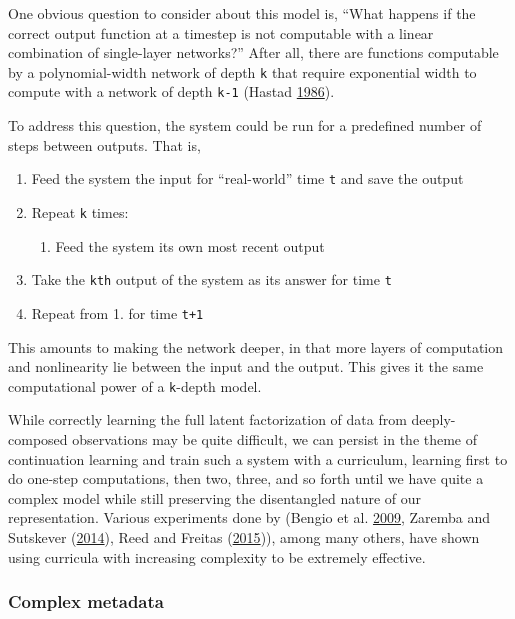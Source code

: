 \documentclass[12pt,twoside]{mitthesis}
\providecommand{\tightlist}{%
  \setlength{\itemsep}{0pt}\setlength{\parskip}{0pt}}
\begin{document}
One obvious question to consider about this model is, ``What happens if
the correct output function at a timestep is not computable with a
linear combination of single-layer networks?'' After all, there are
functions computable by a polynomial-width network of depth \texttt{k}
that require exponential width to compute with a network of depth
\texttt{k-1} (Hastad \protect\hyperlink{ref-hastad1986almost}{1986}).

To address this question, the system could be run for a predefined
number of steps between outputs. That is,

\begin{enumerate}
\def\labelenumi{\arabic{enumi}.}
\tightlist
\item
  Feed the system the input for ``real-world'' time \texttt{t} and save
  the output
\item
  Repeat \texttt{k} times:

  \begin{enumerate}
  \def\labelenumii{\alph{enumii}.}
  \tightlist
  \item
    Feed the system its own most recent output
  \end{enumerate}
\item
  Take the \texttt{kth} output of the system as its answer for time
  \texttt{t}
\item
  Repeat from 1. for time \texttt{t+1}
\end{enumerate}

This amounts to making the network deeper, in that more layers of
computation and nonlinearity lie between the input and the output. This
gives it the same computational power of a \texttt{k}-depth model.

While correctly learning the full latent factorization of data from
deeply-composed observations may be quite difficult, we can persist in
the theme of continuation learning and train such a system with a
curriculum, learning first to do one-step computations, then two, three,
and so forth until we have quite a complex model while still preserving
the disentangled nature of our representation. Various experiments done
by (Bengio et al. \protect\hyperlink{ref-bengio2009curriculum}{2009},
Zaremba and Sutskever
(\protect\hyperlink{ref-zaremba2014learning}{2014}), Reed and Freitas
(\protect\hyperlink{ref-reed2015neural}{2015})), among many others, have
shown using curricula with increasing complexity to be extremely
effective.

\subsubsection{Complex metadata}\label{complex-metadata}
\end{document}
